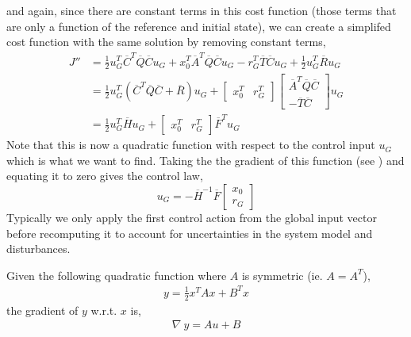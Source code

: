 \documentclass{article}
\newcommand{\doublebar}[1]{\overline{#1}}
\begin{document}
and again, since there are constant terms in this cost function (those terms that are only a function of the reference
and initial state), we can create a simplifed cost function with the same solution by removing constant terms,
\begin{align}
    J''
    &=
    \tfrac{1}{2}u_G^T\doublebar{C}^T\doublebar{Q}\doublebar{C}u_G
    + x_0^T\doublebar{A}^T\doublebar{Q}\doublebar{C}u_G
    - r_G^T\doublebar{T}\doublebar{C}u_G
    + \tfrac{1}{2}u_G^T\doublebar{R}u_G
    \\
    &=
    \tfrac{1}{2}u_G^T\left(\doublebar{C}^T\doublebar{Q}\doublebar{C} + \doublebar{R}\right)u_G
    +
    \begin{bmatrix} x_0^T & r_G^T \end{bmatrix}
    \begin{bmatrix} \doublebar{A}^T\doublebar{Q}\doublebar{C} \\ -\doublebar{T}\doublebar{C} \end{bmatrix} u_G
    \\
    &= \tfrac{1}{2}u_G^T\doublebar{H}u_G +  \begin{bmatrix} x_0^T & r_G^T \end{bmatrix}\doublebar{F}^Tu_G
\end{align}
Note that this is now a quadratic function with respect to the control input $u_G$ which is what we want to find.
Taking the the gradient of this function (see ) and equating it to zero gives the
control law,
\begin{equation}
    u_G = - \doublebar{H}^{-1}\doublebar{F}\begin{bmatrix} x_0 \\ r_G \end{bmatrix}
\end{equation}
Typically we only apply the first control action from the global input vector before recomputing it to account for
uncertainties in the system model and disturbances.

\begin{tcolorbox}[title={Gradient of Quadratic Functions}]
    Given the following quadratic function where $A$ is symmetric (ie. $A=A^T$),
    \begin{align}
        y = \frac{1}{2}x^TAx + B^Tx
        \label{eq:grad-a}
    \end{align}
    the gradient of $y$ w.r.t. $x$ is,
    \begin{align}
        \nabla~y = Au + B
        \label{eq:grad-b}
    \end{align}
\end{tcolorbox}
\end{document}
